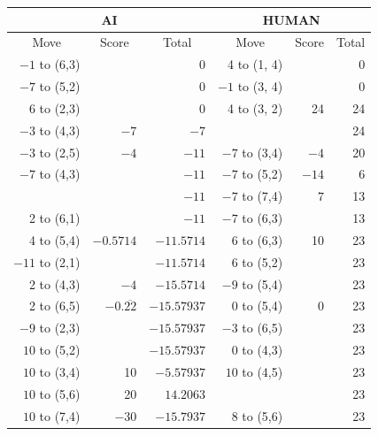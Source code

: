 \begin{appendices}
\begin{table}[H]
    \centering
    \begin{tabular}{rrrrrr}
        \hline
        \multicolumn{3}{c}{AI}        & \multicolumn{3}{c}{HUMAN}     \\ \hline
        \multicolumn{1}{c}{Move}         & \multicolumn{1}{c}{Score} & \multicolumn{1}{c}{Total} & \multicolumn{1}{c}{Move}         & \multicolumn{1}{c}{Score} & \multicolumn{1}{c}{Total} \\ \hline
          $-1$ to (6,3) &      &  0    &   4 to (1, 4) &      &  0    \\ \hline
          $-7$ to (5,2) &      &  0    &   $-1$ to (3, 4) &      &  0    \\ \hline
          6 to (2,3) &       &  0    &   4 to (3, 2) &  24   &  24    \\ \hline
         $-3$ to (4,3) & $-7$ &  $-7$ &               &       &  24    \\ \hline
         $-3$ to (2,5) & $-4$ &  $-11$ &  $-7$ to (3,4) & $-4$ &  20    \\ \hline
         $-7$ to (4,3) &      &  $-11$ &  $-7$ to (5,2) & $-14$ &  6    \\ \hline
                      &      &  $-11$ &  $-7$ to (7,4) & $7$   &  13    \\ \hline
          2 to (6,1)  &      &  $-11$ &  $-7$ to (6,3) &       &  13    \\ \hline
          4 to (5,4)  & $-0.5714$  &  $-11.5714$ &  6 to (6,3) & 10       &  23    \\ \hline
          $-11$ to (2,1)  &          &  $-11.5714$ &  6 to (5,2) &          &  23    \\ \hline
          2 to (4,3)  & $-4$       &  $-15.5714$ &  $-9$ to (5,4) &          &  23    \\ \hline
          2 to (6,5)  & $-0.\overline{22}$    &  $-15.57937$ &  $0$ to (5,4) &  0 &  23    \\ \hline
          $-9$ to (2,3)  &    &  $-15.57937$ &  $-3$ to (6,5) &    &  23    \\ \hline
          $10$ to (5,2)  &    &  $-15.57937$ &  $0$ to (4,3) &    &  23    \\ \hline
          $10$ to (3,4)  & 10    &  $-5.57937$ &  $10$ to (4,5) &    &  23    \\ \hline
          $10$ to (5,6)  & 20    &  $14.2063$ &                 &    &  23    \\ \hline
          $10$ to (7,4)  & $-30$    &  $-15.7937$ & 8 to (5,6)    &    &  23    \\ \hline

\end{tabular}
\end{table}
\end{appendices}

